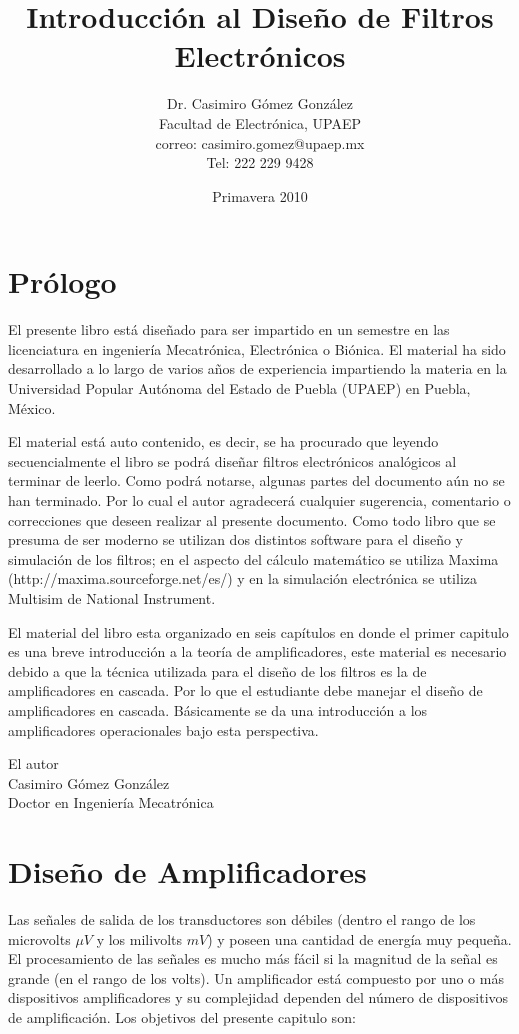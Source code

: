 \documentclass[12pt]{book}
\title{Introducción al Diseño de Filtros Electrónicos}
\author{Dr. Casimiro Gómez González\\
	Facultad de Electrónica, UPAEP\\
               correo: casimiro.gomez@upaep.mx\\
               Tel: 222 229 9428}
\date{Primavera 2010}
\theoremstyle{definition}
\theoremstyle{remark}
\theoremstyle{plain}
\begin{document}
\frontmatter
\maketitle


\chapter{Prólogo}

El presente libro está diseñado para ser impartido en un semestre en las licenciatura en ingeniería Mecatrónica, Electrónica o Biónica. El material ha sido desarrollado a lo largo de varios años de experiencia impartiendo la materia en la Universidad Popular Autónoma del Estado de Puebla (UPAEP) en Puebla, México.

El material está auto contenido, es decir, se ha procurado que leyendo secuencialmente el libro se podrá diseñar filtros electrónicos analógicos al terminar de leerlo. Como podrá notarse, algunas partes del documento aún no se han terminado. Por lo cual el autor agradecerá cualquier sugerencia, comentario o correcciones que deseen realizar al presente documento. Como todo libro que se presuma de ser moderno se utilizan dos distintos software para el diseño y simulación de los filtros; en el aspecto del cálculo matemático se utiliza Maxima (http://maxima.sourceforge.net/es/)  y en la simulación electrónica se utiliza Multisim de National Instrument.

El material del libro esta organizado en seis capítulos en donde el primer capitulo es una breve introducción a la teoría de amplificadores, este material es necesario debido a que la técnica utilizada para el diseño de los filtros es la de amplificadores en cascada. Por lo que el estudiante debe manejar el diseño de amplificadores en cascada. Básicamente se da una introducción a los amplificadores operacionales bajo esta perspectiva.


\begin{flushright}

El autor\\
Casimiro Gómez González\\
Doctor en Ingeniería Mecatrónica
\end{flushright}

\tableofcontents

\mainmatter
\chapter{Diseño de Amplificadores}
Las señales de salida de los transductores son débiles (dentro el rango de los microvolts $\mu V$ y los milivolts $mV$) y poseen una cantidad de energía muy pequeña. El procesamiento de las señales es mucho más fácil si la magnitud de la señal es grande (en el rango de los volts). Un amplificador está compuesto por uno o más dispositivos amplificadores y su complejidad dependen del número de dispositivos de amplificación. Los objetivos del presente capitulo son:
\end{document}
